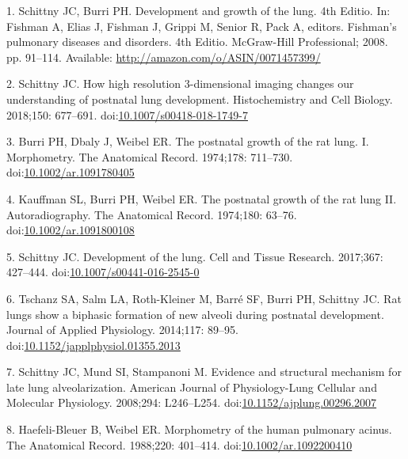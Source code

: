 \documentclass[
  american,
]{article}
\newenvironment{cslreferences}%
  {}%
  {\par}
\begin{document}
\hypertarget{refs}{}
\begin{cslreferences}
\leavevmode\hypertarget{ref-TsNwin2E}{}%
1. Schittny JC, Burri PH. Development and growth of the lung. 4th Editio. In: Fishman A, Elias J, Fishman J, Grippi M, Senior R, Pack A, editors. Fishman's pulmonary diseases and disorders. 4th Editio. McGraw-Hill Professional; 2008. pp. 91--114. Available: \url{http://amazon.com/o/ASIN/0071457399/}

\leavevmode\hypertarget{ref-ODQCVC23}{}%
2. Schittny JC. How high resolution 3-dimensional imaging changes our understanding of postnatal lung development. Histochemistry and Cell Biology. 2018;150: 677--691. doi:\href{https://doi.org/10.1007/s00418-018-1749-7}{10.1007/s00418-018-1749-7}

\leavevmode\hypertarget{ref-auNiE56G}{}%
3. Burri PH, Dbaly J, Weibel ER. The postnatal growth of the rat lung. I. Morphometry. The Anatomical Record. 1974;178: 711--730. doi:\href{https://doi.org/10.1002/ar.1091780405}{10.1002/ar.1091780405}

\leavevmode\hypertarget{ref-1AhvLCPky}{}%
4. Kauffman SL, Burri PH, Weibel ER. The postnatal growth of the rat lung II. Autoradiography. The Anatomical Record. 1974;180: 63--76. doi:\href{https://doi.org/10.1002/ar.1091800108}{10.1002/ar.1091800108}

\leavevmode\hypertarget{ref-XQLPrPTJ}{}%
5. Schittny JC. Development of the lung. Cell and Tissue Research. 2017;367: 427--444. doi:\href{https://doi.org/10.1007/s00441-016-2545-0}{10.1007/s00441-016-2545-0}

\leavevmode\hypertarget{ref-wnl86DEM}{}%
6. Tschanz SA, Salm LA, Roth-Kleiner M, Barré SF, Burri PH, Schittny JC. Rat lungs show a biphasic formation of new alveoli during postnatal development. Journal of Applied Physiology. 2014;117: 89--95. doi:\href{https://doi.org/10.1152/japplphysiol.01355.2013}{10.1152/japplphysiol.01355.2013}

\leavevmode\hypertarget{ref-d1YV8oOK}{}%
7. Schittny JC, Mund SI, Stampanoni M. Evidence and structural mechanism for late lung alveolarization. American Journal of Physiology-Lung Cellular and Molecular Physiology. 2008;294: L246--L254. doi:\href{https://doi.org/10.1152/ajplung.00296.2007}{10.1152/ajplung.00296.2007}

\leavevmode\hypertarget{ref-BbEFwEVD}{}%
8. Haefeli-Bleuer B, Weibel ER. Morphometry of the human pulmonary acinus. The Anatomical Record. 1988;220: 401--414. doi:\href{https://doi.org/10.1002/ar.1092200410}{10.1002/ar.1092200410}


\end{cslreferences}
\end{document}
